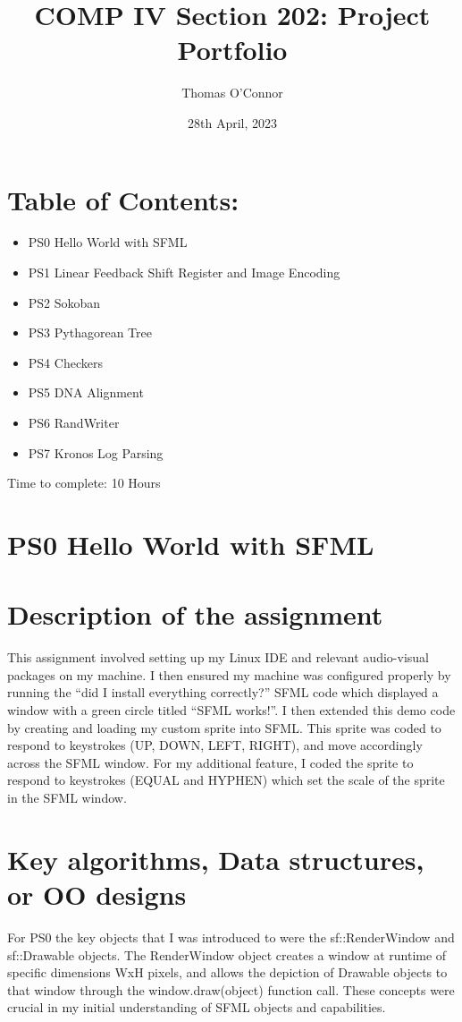 \documentclass[12pt]{article}
\title{COMP IV Section 202: Project Portfolio}
\author{Thomas O'Connor}
\date{28th April, 2023}
\begin{document}
\maketitle

\section*{Table of Contents:}
\begin{itemize}
	\item PS0 Hello World with SFML
	\item PS1 Linear Feedback Shift Register and Image Encoding
	\item PS2 Sokoban
	\item PS3 Pythagorean Tree 
	\item PS4 Checkers
	\item PS5 DNA Alignment
	\item PS6 RandWriter
	\item PS7 Kronos Log Parsing
\end{itemize}
Time to complete: 10 Hours

\newpage
\section*{PS0 Hello World with SFML}

\section[1]{Description of the assignment}
\hfill\begin{minipage}{\dimexpr\textwidth-1cm}
This assignment involved setting up my Linux IDE and relevant audio-visual packages on my machine. I then ensured my machine was configured properly by running the “did I install everything correctly?” SFML code which displayed a window with a green circle titled “SFML works!”. I then extended this demo code by creating and loading my custom sprite into SFML. This sprite was coded to respond to keystrokes (UP, DOWN, LEFT, RIGHT), and move accordingly across the SFML window. For my additional feature, I coded the sprite to respond to keystrokes (EQUAL and HYPHEN) which set the scale of the sprite in the SFML window. 
\end{minipage}

\section[2]{Key algorithms, Data structures, or OO designs}
\hfill\begin{minipage}{\dimexpr\textwidth-1cm}
For PS0 the key objects that I was introduced to were the sf::RenderWindow and sf::Drawable objects. The RenderWindow object creates a window at runtime of specific dimensions WxH pixels, and allows the depiction of Drawable objects to that window through the window.draw(object) function call. These concepts were crucial in my initial understanding of SFML objects and capabilities.
\end{minipage}
\end{document}
